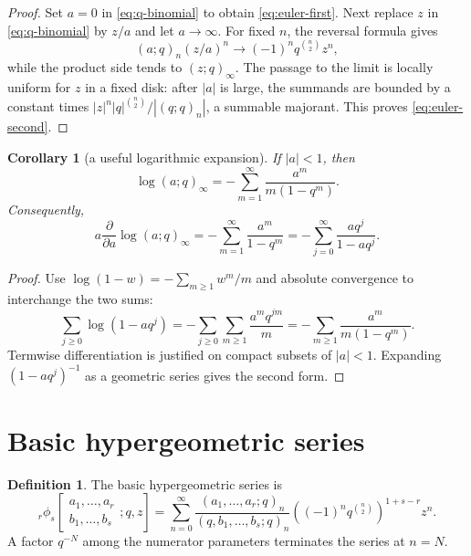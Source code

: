 \documentclass[11pt,oneside]{article}
\newtheorem{corollary}[theorem]{Corollary}
\theoremstyle{definition}
\newtheorem{definition}[theorem]{Definition}
\begin{document}
\begin{proof}
Set $a=0$ in \eqref{eq:q-binomial} to obtain \eqref{eq:euler-first}. Next replace $z$ in \eqref{eq:q-binomial} by $z/a$ and let $a\to\infty$. For fixed $n$, the reversal formula gives
\[
 (a;q)_n(z/a)^n\longrightarrow(-1)^nq^{\binom n2}z^n,
\]
while the product side tends to $(z;q)_\infty$. The passage to the limit is locally uniform for $z$ in a fixed disk: after $|a|$ is large, the summands are bounded by a constant times $|z|^n|q|^{\binom n2}/|(q;q)_n|$, a summable majorant. This proves \eqref{eq:euler-second}.
\end{proof}

\begin{corollary}[a useful logarithmic expansion]\label{cor:log-pochhammer}
If $|a|<1$, then
\begin{equation}\label{eq:log-pochhammer}
 \log(a;q)_\infty=-\sum_{m=1}^{\infty}\frac{a^m}{m(1-q^m)}.
\end{equation}
Consequently,
\begin{equation}\label{eq:log-derivative}
 a\frac{\partial}{\partial a}\log(a;q)_\infty
 =-\sum_{m=1}^{\infty}\frac{a^m}{1-q^m}
 =-\sum_{j=0}^{\infty}\frac{aq^j}{1-aq^j}.
\end{equation}
\end{corollary}

\begin{proof}
Use $\log(1-w)=-\sum_{m\ge1}w^m/m$ and absolute convergence to interchange the two sums:
\[
 \sum_{j\ge0}\log(1-aq^j)
 =-\sum_{j\ge0}\sum_{m\ge1}\frac{a^mq^{jm}}m
 =-\sum_{m\ge1}\frac{a^m}{m(1-q^m)}.
\]
Termwise differentiation is justified on compact subsets of $|a|<1$. Expanding $(1-aq^j)^{-1}$ as a geometric series gives the second form.
\end{proof}

\section{Basic hypergeometric series}

\begin{definition}
The basic hypergeometric series is
\begin{equation}\label{eq:rphis-def}
 {}_r\phi_s\!\left[
 \begin{matrix}a_1,\ldots,a_r\\ b_1,\ldots,b_s\end{matrix};q,z\right]
 =\sum_{n=0}^{\infty}
 \frac{(a_1,\ldots,a_r;q)_n}{(q,b_1,\ldots,b_s;q)_n}
 \left((-1)^nq^{\binom n2}\right)^{1+s-r}z^n.
\end{equation}
A factor $q^{-N}$ among the numerator parameters terminates the series at $n=N$.
\end{definition}
\end{document}
